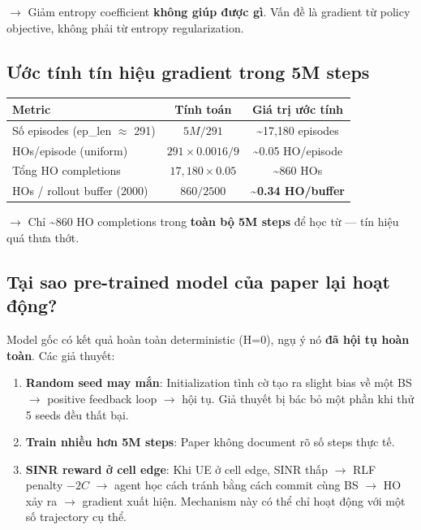 \documentclass[11pt]{article}
\begin{document}
$\rightarrow$ Giảm entropy coefficient \textbf{không giúp được gì}. Vấn đề là gradient từ policy objective, không phải từ entropy regularization.

\subsection{Ước tính tín hiệu gradient trong 5M steps}

\begin{longtable}{@{}lcc@{}}
\toprule
\textbf{Metric} & \textbf{Tính toán} & \textbf{Giá trị ước tính} \\
\midrule
\endhead
Số episodes (ep\_len $\approx$ 291) & $5M / 291$ & \textasciitilde 17{,}180 episodes \\
HOs/episode (uniform) & $291 \times 0.0016 / 9$ & \textasciitilde 0.05 HO/episode \\
Tổng HO completions & $17{,}180 \times 0.05$ & \textasciitilde 860 HOs \\
HOs / rollout buffer (2000) & $860 / 2500$ & \textbf{\textasciitilde 0.34 HO/buffer} \\
\bottomrule
\end{longtable}

$\rightarrow$ Chỉ \textasciitilde 860 HO completions trong \textbf{toàn bộ 5M steps} để học từ --- tín hiệu quá thưa thớt.

\subsection{Tại sao pre-trained model của paper lại hoạt động?}

Model gốc có kết quả hoàn toàn deterministic (H=0), ngụ ý nó \textbf{đã hội tụ hoàn toàn}. Các giả thuyết:

\begin{enumerate}
  \item \textbf{Random seed may mắn}: Initialization tình cờ tạo ra slight bias về một BS $\rightarrow$ positive feedback loop $\rightarrow$ hội tụ. Giả thuyết bị bác bỏ một phần khi thử 5 seeds đều thất bại.
  \item \textbf{Train nhiều hơn 5M steps}: Paper không document rõ số steps thực tế.
  \item \textbf{SINR reward ở cell edge}: Khi UE ở cell edge, SINR thấp $\rightarrow$ RLF penalty $-2C$ $\rightarrow$ agent học cách tránh bằng cách commit cùng BS $\rightarrow$ HO xảy ra $\rightarrow$ gradient xuất hiện. Mechanism này có thể chỉ hoạt động với một số trajectory cụ thể.
\end{enumerate}
\end{document}

